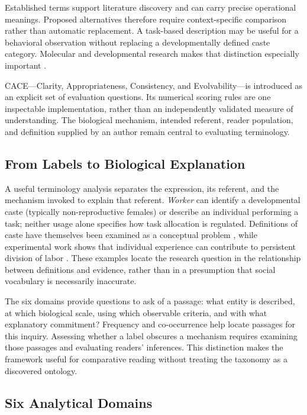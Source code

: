\documentclass[
]{article}
\numberwithin{equation}{section}
\begin{document}
Established terms support literature discovery and can carry precise
operational meanings. Proposed alternatives therefore require
context-specific comparison rather than automatic replacement. A
task-based description may be useful for a behavioral observation
without replacing a developmentally defined caste category. Molecular
and developmental research makes that distinction especially important
\citep{sumner2018molecular, qiu2022canalized}.

CACE---Clarity, Appropriateness, Consistency, and Evolvability---is
introduced as an explicit set of evaluation questions. Its numerical
scoring rules are one inspectable implementation, rather than an
independently validated measure of understanding. The biological
mechanism, intended referent, reader population, and definition supplied
by an author remain central to evaluating terminology.

\subsection{From Labels to Biological
Explanation}\label{from-labels-to-biological-explanation}

A useful terminology analysis separates the expression, its referent,
and the mechanism invoked to explain that referent. \emph{Worker} can
identify a developmental caste (typically non-reproductive females) or
describe an individual performing a task; neither usage alone specifies
how task allocation is regulated. Definitions of caste have themselves
been examined as a conceptual problem \citep{villet1992caste}, while
experimental work shows that individual experience can contribute to
persistent division of labor \citep{ravary2007}. These examples locate
the research question in the relationship between definitions and
evidence, rather than in a presumption that social vocabulary is
necessarily inaccurate.

The six domains provide questions to ask of a passage: what entity is
described, at which biological scale, using which observable criteria,
and with what explanatory commitment? Frequency and co-occurrence help
locate passages for this inquiry. Assessing whether a label obscures a
mechanism requires examining those passages and evaluating readers'
inferences. This distinction makes the framework useful for comparative
reading without treating the taxonomy as a discovered ontology.

\subsection{Six Analytical Domains}\label{six-analytical-domains}
\end{document}
